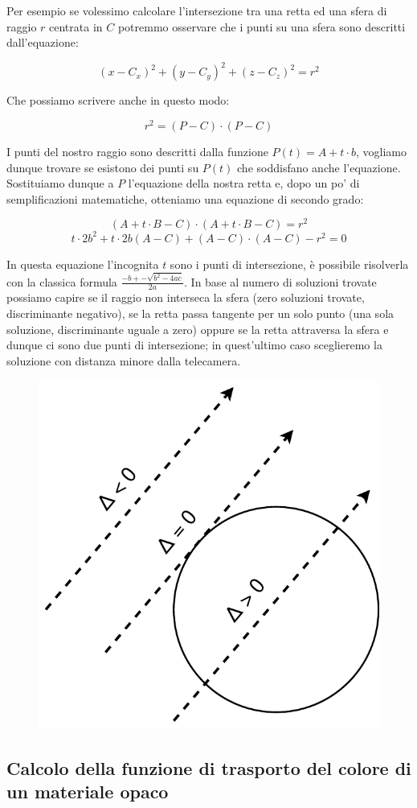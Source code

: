 \documentclass[12pt, twoside]{article}
\begin{document}
Per esempio se volessimo calcolare l'intersezione tra una retta ed una sfera
di raggio $r$ centrata in $C$ potremmo osservare che i punti su una sfera sono
descritti dall'equazione:

$$
    (x - C_x)^2 + (y - C_y)^2 + (z - C_z)^2 = r^2
$$

Che possiamo scrivere anche in questo modo:

$$
    r^2 = (P - C) \cdot (P - C)
$$

I punti del nostro raggio sono descritti dalla funzione $P(t)=A + t \cdot b$,
vogliamo dunque trovare se esistono dei punti su $P(t)$ che soddisfano anche
l'equazione.
Sostituiamo dunque a $P$ l'equazione della nostra retta e, dopo un po' di
semplificazioni matematiche, otteniamo una equazione di secondo grado:

$$
  (A + t \cdot B - C) \cdot (A + t \cdot B - C) = r^2
$$
$$
  t \cdot 2b^2 + t \cdot 2b (A-C) + (A-C) \cdot (A-C) - r^2 = 0
$$

In questa equazione l'incognita $t$ sono i punti di intersezione, è possibile
risolverla con la classica formula $\frac{-b +- \sqrt{b^2 - 4ac}}{2a}$.
In base al numero di soluzioni trovate possiamo capire se il raggio non
interseca la sfera (zero soluzioni trovate, discriminante negativo), se la
retta passa tangente per un solo punto (una sola soluzione, discriminante
uguale a zero) oppure se la retta attraversa la sfera e dunque ci sono due
punti di intersezione; in quest'ultimo caso sceglieremo la soluzione con
distanza minore dalla telecamera.

\begin{figure}[h]
  \centering
  \includegraphics[width=0.5\linewidth,keepaspectratio]{images/SphereRayIntersection.pdf}
\end{figure}

\subsection{Calcolo della funzione di trasporto del colore di un materiale opaco}
\end{document}
